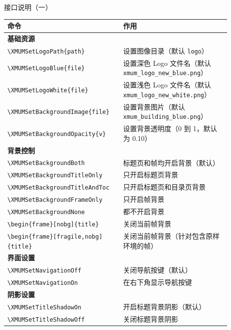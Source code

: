\documentclass[aspectratio=169,11pt]{ctexbeamer}
\begin{document}
\begin{frame}{接口说明（一）}
    \begin{table}
        \centering
        \tiny
        \begin{tabular}{p{0.45\linewidth}p{0.45\linewidth}}
            \toprule
            命令 & 作用 \\
            \midrule
            \multicolumn{2}{l}{\textbf{基础资源}} \\
            \texttt{\textbackslash XMUMSetLogoPath\{path\}} & 设置图像目录（默认 \texttt{logo}） \\
            \texttt{\textbackslash XMUMSetLogoBlue\{file\}} & 设置深色 Logo 文件名（默认 \texttt{xmum\_logo\_new\_blue.png}） \\
            \texttt{\textbackslash XMUMSetLogoWhite\{file\}} & 设置浅色 Logo 文件名（默认 \texttt{xmum\_logo\_new\_white.png}） \\
            \texttt{\textbackslash XMUMSetBackgroundImage\{file\}} & 设置背景图片（默认 \texttt{xmum\_building\_blue.png}） \\
            \texttt{\textbackslash XMUMSetBackgroundOpacity\{v\}} & 设置背景透明度（0 到 1，默认为 0.10） \\
            \midrule
            \multicolumn{2}{l}{\textbf{背景控制}} \\
            \texttt{\textbackslash XMUMSetBackgroundBoth} & 标题页和帧均开启背景（默认） \\
            \texttt{\textbackslash XMUMSetBackgroundTitleOnly} & 只开启标题页背景 \\
            \texttt{\textbackslash XMUMSetBackgroundTitleAndToc} & 只开启标题页和目录页背景 \\
            \texttt{\textbackslash XMUMSetBackgroundFrameOnly} & 只开启帧背景 \\
            \texttt{\textbackslash XMUMSetBackgroundNone} & 都不开启背景 \\
            \texttt{\textbackslash begin\{frame\}[nobg]\{title\}} & 关闭当前帧背景 \\
            \texttt{\textbackslash begin\{frame\}[fragile,nobg]\{title\}} & 关闭当前帧背景（针对包含原样环境的帧） \\
            \midrule
            \multicolumn{2}{l}{\textbf{界面设置}} \\
            \texttt{\textbackslash XMUMSetNavigationOff} & 关闭导航按键（默认） \\
            \texttt{\textbackslash XMUMSetNavigationOn} & 在右下角显示导航按键 \\
            \midrule
            \multicolumn{2}{l}{\textbf{阴影设置}} \\
            \texttt{\textbackslash XMUMSetTitleShadowOn} & 开启标题背景阴影（默认） \\
            \texttt{\textbackslash XMUMSetTitleShadowOff} & 关闭标题背景阴影 \\
            \bottomrule
        \end{tabular}
    \end{table}
\end{frame}
\end{document}
